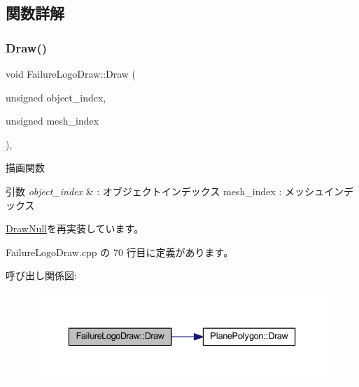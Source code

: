 \subsection{関数詳解}
\mbox{\label{class_failure_logo_draw_a8ee20e1697bbbaf7f41c18334830488a}} 
\subsubsection{\texorpdfstring{Draw()}{Draw()}}
{\footnotesize\ttfamily void Failure\+Logo\+Draw\+::\+Draw (\begin{DoxyParamCaption}\item[{unsigned}]{object\+\_\+index,  }\item[{unsigned}]{mesh\+\_\+index }\end{DoxyParamCaption})\hspace{0.3cm}{\ttfamily [override]}, {\ttfamily [virtual]}}



描画関数 


\begin{DoxyParams}{引数}
{\em object\+\_\+index} & \+: オブジェクトインデックス mesh\+\_\+index \+: メッシュインデックス \\
\hline
\end{DoxyParams}


\mbox{\hyperlink{class_draw_null_afe50f6fd820b18d673f70f048743f339}{Draw\+Null}}を再実装しています。



 Failure\+Logo\+Draw.\+cpp の 70 行目に定義があります。

呼び出し関係図\+:\nopagebreak
\begin{figure}[H]
\begin{center}
\leavevmode
\includegraphics[width=336pt]{class_failure_logo_draw_a8ee20e1697bbbaf7f41c18334830488a_cgraph}
\end{center}
\end{figure}
\mbox{\label{class_failure_logo_draw_a2a74fafba17b2f63b1c61abd67289afd}} 
